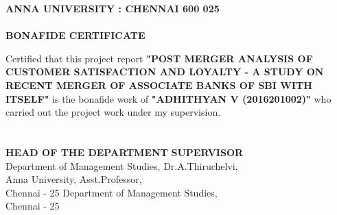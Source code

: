\documentclass[a4paper, 14pt]{article}
\newcommand\tab[1][1cm]{\hspace*{#1}}
\begin{document}
{%
\newpage
\begin{center}
\textbf{\fontsize{18}{2} \selectfont ANNA UNIVERSITY : CHENNAI 600 025}\\
\tab \\
\textbf{\fontsize{16}{2} \selectfont BONAFIDE CERTIFICATE}\\
\end{center}
Certified that this project report \textbf{"POST MERGER ANALYSIS OF CUSTOMER SATISFACTION AND LOYALTY - A STUDY ON RECENT MERGER OF ASSOCIATE BANKS OF SBI WITH ITSELF"} is the bonafide work of \textbf{"ADHITHYAN V (2016201002)"} who carried out the project work under my supervision.
\tab \\
\tab \\
\tab \\

\noindent \textbf{HEAD OF THE DEPARTMENT} \hfill \hfill \textbf{SUPERVISOR}\\
\noindent Department of Management Studies, \hfill \hfill Dr.A.Thiruchelvi,\\
\noindent Anna University, \hfill \hfill Asst.Professor,\\
\noindent Chennai - 25 \hfill \hfill Department of Management Studies,\\
\noindent \tab \hfill \hfill Chennai - 25\\

}
\end{document}
